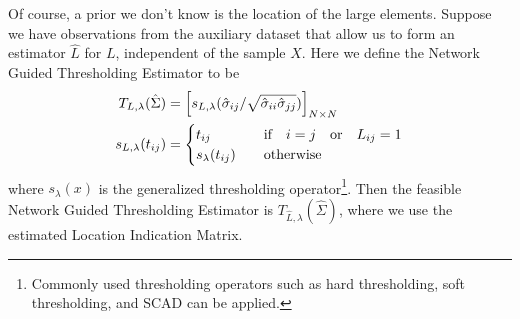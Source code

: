Of course, a prior we don't know is the location of the large elements. Suppose we have observations from the auxiliary dataset that allow us to form an estimator $\hat{L}$ for $L$, independent of the sample \(X\). Here we define the Network Guided Thresholding Estimator to be 
\begin{align*}
    T_{L,\lambda}(\hat{\Sigma}) &= \bqty{s_{L, \lambda } (\hat{\sigma}_{ij} / \sqrt{\hat \sigma_{ii} \hat \sigma_{jj} } )}_{N\times N}\\
    s_{L,\lambda} \pqty{t_{ij}} &= 
    \begin{cases}
        t_{ij} &\qq{if} i = j \qq{or} L_{ij} = 1\\ 
        s_{\lambda}(t_{ij}) &\qq{otherwise} 
    \end{cases}
    \label{network thresholding estimator}
\end{align*}
where \(s_{\lambda}(x)\) is the generalized thresholding operator\footnote{Commonly used thresholding operators
such as hard thresholding, soft thresholding, and SCAD can be applied.}. Then the feasible Network Guided Thresholding Estimator is $T_{\hat L, \lambda} (\hat \Sigma)$, where we use the estimated Location Indication Matrix.

